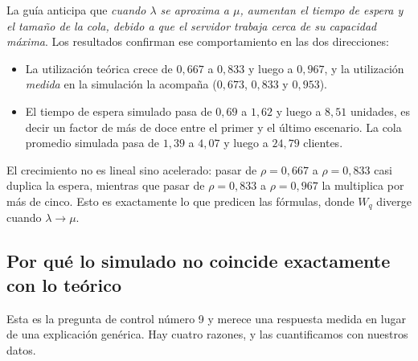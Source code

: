 \documentclass[11pt,a4paper]{article}
\begin{document}
La guía anticipa que \emph{cuando $\lambda$ se aproxima a $\mu$, aumentan el tiempo de
espera y el tamaño de la cola, debido a que el servidor trabaja cerca de su capacidad
máxima}. Los resultados confirman ese comportamiento en las dos direcciones:

\begin{itemize}
    \item La utilización teórica crece de $0{,}667$ a $0{,}833$ y luego a $0{,}967$, y la
    utilización \emph{medida} en la simulación la acompaña ($0{,}673$, $0{,}833$ y
    $0{,}953$).
    \item El tiempo de espera simulado pasa de $0{,}69$ a $1{,}62$ y luego a $8{,}51$
    unidades, es decir un factor de más de doce entre el primer y el último escenario.
    La cola promedio simulada pasa de $1{,}39$ a $4{,}07$ y luego a $24{,}79$ clientes.
\end{itemize}

El crecimiento no es lineal sino acelerado: pasar de $\rho = 0{,}667$ a $\rho = 0{,}833$
casi duplica la espera, mientras que pasar de $\rho = 0{,}833$ a $\rho = 0{,}967$ la
multiplica por más de cinco. Esto es exactamente lo que predicen las fórmulas, donde
$W_q$ diverge cuando $\lambda \to \mu$.

\subsection{Por qué lo simulado no coincide exactamente con lo teórico}

Esta es la pregunta de control número 9 y merece una respuesta medida en lugar de una
explicación genérica. Hay cuatro razones, y las cuantificamos con nuestros datos.
\end{document}
